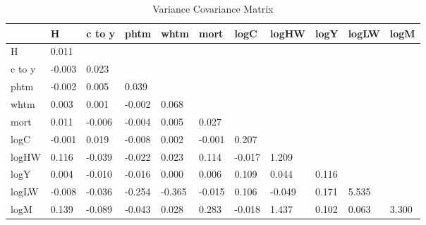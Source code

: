 \begin{table}[htbp]
\caption{\label{clabel} Variance Covariance Matrix}\centering\medskip
\begin{tabular}{lllllllllll} \hline \hline
 & H  & c to y  & phtm  & whtm  & mort  & logC  & logHW  & logY  & logLW  & logM  \\  \hline 
H &     0.011 \\  
c to y &    -0.003 &     0.023 \\  
phtm &    -0.002 &     0.005 &     0.039 \\  
whtm &     0.003 &     0.001 &    -0.002 &     0.068 \\  
mort &     0.011 &    -0.006 &    -0.004 &     0.005 &     0.027 \\  
logC &    -0.001 &     0.019 &    -0.008 &     0.002 &    -0.001 &     0.207 \\  
logHW &     0.116 &    -0.039 &    -0.022 &     0.023 &     0.114 &    -0.017 &     1.209 \\  
logY &     0.004 &    -0.010 &    -0.016 &     0.000 &     0.006 &     0.109 &     0.044 &     0.116 \\  
logLW &    -0.008 &    -0.036 &    -0.254 &    -0.365 &    -0.015 &     0.106 &    -0.049 &     0.171 &     5.535 \\  
logM &     0.139 &    -0.089 &    -0.043 &     0.028 &     0.283 &    -0.018 &     1.437 &     0.102 &     0.063 &     3.300 \\  
\hline \hline \end{tabular}
\end{table}
